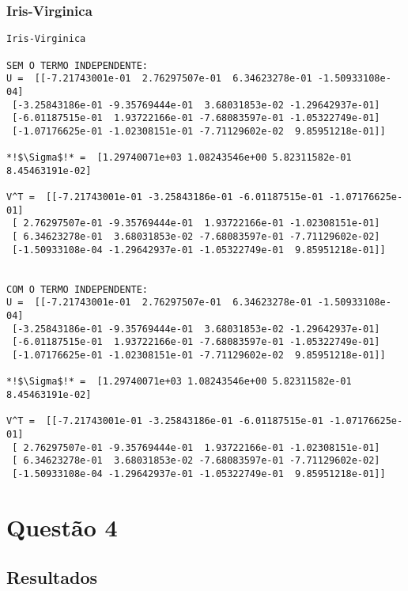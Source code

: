 \documentclass[a4paper,12pt,twoside]{article}
\begin{document}
\subsubsection{Iris-Virginica}
\begin{lstlisting}
Iris-Virginica

SEM O TERMO INDEPENDENTE: 
U =  [[-7.21743001e-01  2.76297507e-01  6.34623278e-01 -1.50933108e-04]
 [-3.25843186e-01 -9.35769444e-01  3.68031853e-02 -1.29642937e-01]
 [-6.01187515e-01  1.93722166e-01 -7.68083597e-01 -1.05322749e-01]
 [-1.07176625e-01 -1.02308151e-01 -7.71129602e-02  9.85951218e-01]]

*!$\Sigma$!* =  [1.29740071e+03 1.08243546e+00 5.82311582e-01 8.45463191e-02]

V^T =  [[-7.21743001e-01 -3.25843186e-01 -6.01187515e-01 -1.07176625e-01]
 [ 2.76297507e-01 -9.35769444e-01  1.93722166e-01 -1.02308151e-01]
 [ 6.34623278e-01  3.68031853e-02 -7.68083597e-01 -7.71129602e-02]
 [-1.50933108e-04 -1.29642937e-01 -1.05322749e-01  9.85951218e-01]]


COM O TERMO INDEPENDENTE: 
U =  [[-7.21743001e-01  2.76297507e-01  6.34623278e-01 -1.50933108e-04]
 [-3.25843186e-01 -9.35769444e-01  3.68031853e-02 -1.29642937e-01]
 [-6.01187515e-01  1.93722166e-01 -7.68083597e-01 -1.05322749e-01]
 [-1.07176625e-01 -1.02308151e-01 -7.71129602e-02  9.85951218e-01]]

*!$\Sigma$!* =  [1.29740071e+03 1.08243546e+00 5.82311582e-01 8.45463191e-02]

V^T =  [[-7.21743001e-01 -3.25843186e-01 -6.01187515e-01 -1.07176625e-01]
 [ 2.76297507e-01 -9.35769444e-01  1.93722166e-01 -1.02308151e-01]
 [ 6.34623278e-01  3.68031853e-02 -7.68083597e-01 -7.71129602e-02]
 [-1.50933108e-04 -1.29642937e-01 -1.05322749e-01  9.85951218e-01]]
\end{lstlisting}

\section{Questão 4}
\subsection{Resultados}
\end{document}
